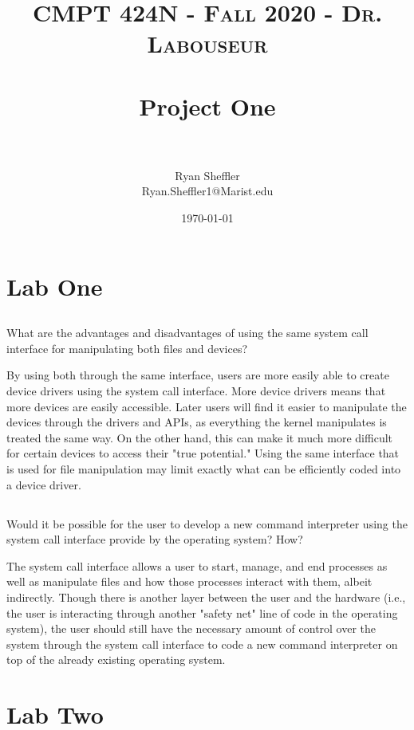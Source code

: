 \documentclass[letterpaper, 10pt,DIV=13]{scrartcl}
\title{	
   \normalfont \normalsize 
   \textsc{CMPT 424N - Fall 2020 - Dr. Labouseur} \\[10pt] %
   \horrule{0.5pt} \\[0.25cm] 	%
   \huge Project One  \\     	    %
   \horrule{0.5pt} \\[0.25cm] 	%
}
\author{Ryan Sheffler \\ \normalsize Ryan.Sheffler1@Marist.edu}
\date{\normalsize\today} 	%
\numberwithin{equation}{section} %
\numberwithin{figure}{section} %
\numberwithin{table}{section} %
\begin{document}
\maketitle %

\section{Lab One}

\subsection{}
What are the advantages and disadvantages of using the same system call interface for manipulating both files and devices?

By using both through the same interface, users are more easily able to create device drivers using the system call interface. More device drivers means that more devices are easily accessible. Later users will find it easier to manipulate the devices through the drivers and APIs, as everything the kernel manipulates is treated the same way. On the other hand, this can make it much more difficult for certain devices to access their "true potential." Using the same interface that is used for file manipulation may limit exactly what can be efficiently coded into a device driver.

\subsection{}
Would it be possible for the user to develop a new command interpreter using the system call interface provide by the operating system? How?

The system call interface allows a user to start, manage, and end processes as well as manipulate files and how those processes interact with them, albeit indirectly. Though there is another layer between the user and the hardware (i.e., the user is interacting through another "safety net" line of code in the operating system), the user should still have the necessary amount of control over the system through the system call interface to code a new command interpreter on top of the already existing operating system.

\pagebreak

\section{Lab Two}
\end{document}
